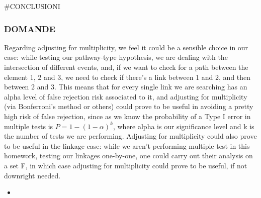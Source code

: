\documentclass[
]{article}
\begin{document}
\#CONCLUSIONI

\hypertarget{domande}{%
\subsubsection{DOMANDE}\label{domande}}

Regarding adjusting for multiplicity, we feel it could be a sensible
choice in our case: while testing our pathway-type hypothesis, we are
dealing with the intersection of different events, and, if we want to
check for a path between the element 1, 2 and 3, we need to check if
there's a link between 1 and 2, and then between 2 and 3. This means
that for every single link we are searching has an alpha level of false
rejection risk associated to it, and adjusting for multiplicity (via
Bonferroni's method or others) could prove to be useful in avoiding a
pretty high risk of false rejection, since as we know the probability of
a Type I error in multiple tests is \(P= 1-(1-\alpha)^{k}\), where alpha
is our significance level and k is the number of tests we are
performing. Adjusting for multiplicity could also prove to be useful in
the linkage case: while we aren't performing multiple test in this
homework, testing our linkages one-by-one, one could carry out their
analysis on a set F, in which case adjusting for multiplicity could
prove to be useful, if not downright needed.

\begin{itemize}
\item
\end{itemize}
\end{document}
